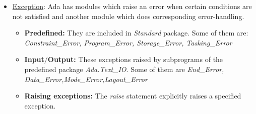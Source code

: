 \documentclass{article}
\begin{document}
\begin{itemize}
	\item \uline{Exception}: Ada has modules which raise an error when certain conditions are not satisfied and another module which does corresponding error-handling.
	\begin{itemize}
		\item \textbf{Predefined:} They are included in \emph{Standard} package. Some of them are: \emph{Constraint\_Error, Program\_Error, Storage\_Error, Tasking\_Error}
		\item \textbf{Input$/$Output:} These exceptions raised by subprograms of the predefined package \emph{Ada.Text\_IO}. Some of them are \emph{End\_Error, Data\_Error,Mode\_Error,Layout\_Error}
		\item \textbf{Raising exceptions:} The \emph{raise} statement explicitly raises a specified exception.
	\end{itemize}
\end{itemize}
\printbibliography
\end{document}
